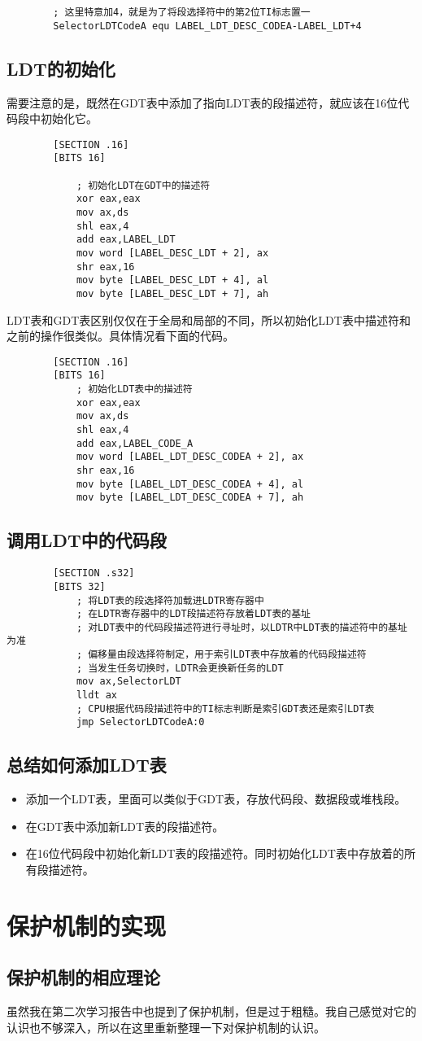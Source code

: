 \documentclass[a4paper,left=2.5cm,right=2.5cm,11pt]{article}
\begin{document}
	\begin{lstlisting}
		; 这里特意加4，就是为了将段选择符中的第2位TI标志置一
		SelectorLDTCodeA equ LABEL_LDT_DESC_CODEA-LABEL_LDT+4
	\end{lstlisting}
\subsection{LDT的初始化}
	需要注意的是，既然在GDT表中添加了指向LDT表的段描述符，就应该在16位代码段中初始化它。
	\begin{lstlisting}
		[SECTION .16]
		[BITS 16]
			
			; 初始化LDT在GDT中的描述符
			xor eax,eax
			mov ax,ds
			shl eax,4
			add eax,LABEL_LDT
			mov word [LABEL_DESC_LDT + 2], ax
			shr eax,16
			mov byte [LABEL_DESC_LDT + 4], al
			mov byte [LABEL_DESC_LDT + 7], ah
	\end{lstlisting}
	
	LDT表和GDT表区别仅仅在于全局和局部的不同，所以初始化LDT表中描述符和之前的操作很类似。具体情况看下面的代码。
	\begin{lstlisting}
		[SECTION .16]
		[BITS 16]
			; 初始化LDT表中的描述符
			xor eax,eax
			mov ax,ds
			shl eax,4
			add eax,LABEL_CODE_A
			mov word [LABEL_LDT_DESC_CODEA + 2], ax
			shr eax,16
			mov byte [LABEL_LDT_DESC_CODEA + 4], al
			mov byte [LABEL_LDT_DESC_CODEA + 7], ah
	\end{lstlisting}
\subsection{调用LDT中的代码段}
	\begin{lstlisting}
		[SECTION .s32]
		[BITS 32]
			; 将LDT表的段选择符加载进LDTR寄存器中
			; 在LDTR寄存器中的LDT段描述符存放着LDT表的基址
			; 对LDT表中的代码段描述符进行寻址时，以LDTR中LDT表的描述符中的基址为准
			; 偏移量由段选择符制定，用于索引LDT表中存放着的代码段描述符
			; 当发生任务切换时，LDTR会更换新任务的LDT
			mov ax,SelectorLDT
			lldt ax
			; CPU根据代码段描述符中的TI标志判断是索引GDT表还是索引LDT表
			jmp SelectorLDTCodeA:0
	\end{lstlisting}
\subsection{总结如何添加LDT表}
	\begin{itemize}
		\item 添加一个LDT表，里面可以类似于GDT表，存放代码段、数据段或堆栈段。
		\item 在GDT表中添加新LDT表的段描述符。
		\item 在16位代码段中初始化新LDT表的段描述符。同时初始化LDT表中存放着的所有段描述符。
	\end{itemize}

\section{保护机制的实现}
\subsection{保护机制的相应理论}
	虽然我在第二次学习报告中也提到了保护机制，但是过于粗糙。我自己感觉对它的认识也不够深入，所以在这里重新整理一下对保护机制的认识。\par
\end{document}
